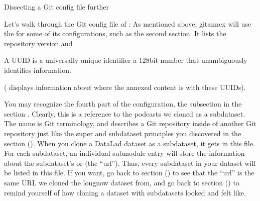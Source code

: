 
\ignorespaces \begin{findoutmore}[label={fom-gitconfig}, before title={\thetcbcounter\ }, float, floatplacement=tb, check odd page=true]{Dissecting a Git config file further}
\label{\detokenize{basics/101-122-config:fom-gitconfig}}

\sphinxAtStartPar
Let’s walk through the Git config file of :
As mentioned above, git\sphinxhyphen{}annex will use the
{\hyperref[\detokenize{glossary:term-Git-config-file}]{}} for some of its configurations, such as the second section.
It lists the repository version and {\hyperref[\detokenize{glossary:term-annex-UUID}]{}}%
\begin{footnote}\sphinxAtStartFootnote
A UUID is a universally unique identifier \textendash{} a 128\sphinxhyphen{}bit number
that unambiguously identifies information.
%
\end{footnote} ( displays information about where the
annexed content is with these UUIDs).

\sphinxAtStartPar
You may recognize the fourth part of the configuration, the subsection
 in the section .
Clearly, this is a reference to the  podcasts
we cloned as a subdataset. The name  is Git
terminology, and describes a Git repository inside of
another Git repository \textendash{} just like
the super\sphinxhyphen{} and subdataset principles you discovered in the
section {\hyperref[\detokenize{basics/101-106-nesting:nesting}]{}} (). When you clone a DataLad dataset
as a subdataset, it gets  in this file.
For each subdataset, an individual submodule entry
will store the information about the subdataset’s
 or  (the “url”).
Thus, every subdataset in your dataset
will be listed in this file.
If you want, go back to section {\hyperref[\detokenize{basics/101-105-install:installds}]{}} () to see that the
“url” is the same URL we cloned the longnow dataset from, and
go back to section {\hyperref[\detokenize{basics/101-116-sharelocal:sharelocal1}]{}} () to remind yourself of
how cloning a dataset with subdatasets looked and felt like.


\end{findoutmore}

